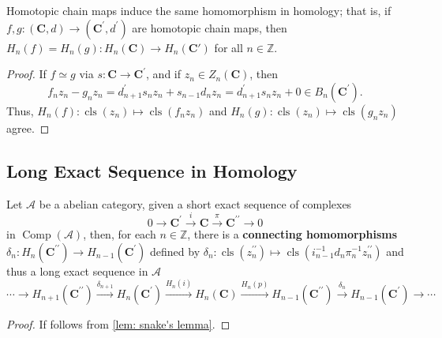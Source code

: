\documentclass[12pt, oneside]{book}
\begin{document}
\begin{proposition}
    \label{pro: homotopy invariance of homology}
    Homotopic chain maps induce the same homomorphism in homology; that is, if $f, g:(\mathbf{C}, d) \rightarrow\left(\mathbf{C}^{\prime}, d^{\prime}\right)$ are homotopic chain maps, then $H_n(f)=H_n(g): H_n(\mathbf{C}) \rightarrow H_n(\mathbf{C}')$ for all $n \in \mathbb{Z}$.
    \begin{proof}
        If $f \simeq g$ via $s: \mathbf{C} \rightarrow \mathbf{C}^{\prime}$, and if $z_n \in Z_n(\mathbf{C})$, then
        \begin{equation*}
            f_n z_n-g_n z_n
            =
            d_{n+1}^{\prime} s_n z_n+s_{n-1} d_n z_n=d_{n+1}^{\prime} s_n z_n+0
            \in
            B_n\left(\mathbf{C}^{\prime}\right) .
        \end{equation*}
        Thus, $H_n(f): \operatorname{cls}\left(z_n\right) \mapsto \operatorname{cls}\left(f_n z_n\right)$ and $H_n(g): \operatorname{cls}\left(z_n\right) \mapsto \operatorname{cls}\left(g_n z_n\right)$ agree.
    \end{proof}
\end{proposition}

\subsection{Long Exact Sequence in Homology} %
\begin{theorem}
    \label{thm: long exact sequence in homology}
    Let $\mathcal{A}$ be a abelian category,
    given a short exact sequence of complexes
    \begin{equation*}
        0 \rightarrow \mathbf{C}^{\prime} \xrightarrow{i} \mathbf{C} \xrightarrow{\pi} \mathbf{C}^{\prime \prime} \rightarrow 0
    \end{equation*}
    in $\operatorname{Comp}(\mathcal{A})$, then, for each $n \in \mathbb{Z}$, there is a \textbf{connecting homomorphisms}
    $\delta_n: H_n\left(\mathbf{C}^{\prime \prime}\right) \rightarrow H_{n-1}\left(\mathbf{C}^{\prime}\right)$
    defined by
    $\delta_n: \operatorname{cls}\left(z_n^{\prime \prime}\right) \mapsto \operatorname{cls}\left(i_{n-1}^{-1} d_n \pi_n^{-1} z_n^{\prime \prime}\right)$
    and thus a long exact sequence in $\mathcal{A}$
    \begin{equation*}
        \cdots \rightarrow H_{n+1}\left(\mathbf{C}^{\prime\prime}\right) \xrightarrow{\delta_{n+1}}
        H_n(\mathbf{C}^\prime) \xrightarrow{H_n(i)}
        H_n\left(\mathbf{C}\right) \xrightarrow{H_n(p)}
        H_{n-1}\left(\mathbf{C}^{\prime\prime}\right) \xrightarrow{\delta   _{n}}H_{n-1}\left(\mathbf{C}^{\prime}\right)\rightarrow \cdots
    \end{equation*}
    \begin{proof}
        If follows from \cref{lem: snake's lemma}.
    \end{proof}
\end{theorem}
\end{document}
